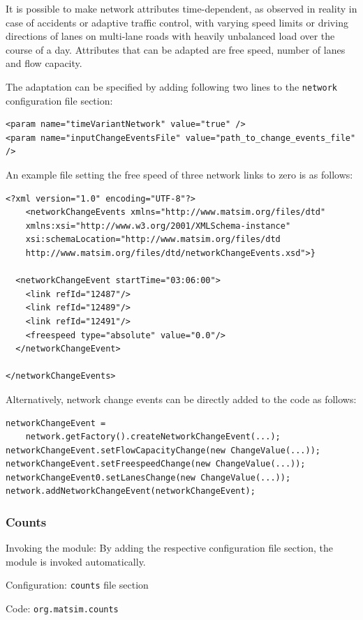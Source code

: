 It is possible to make network attributes time-dependent, as observed in reality in case of accidents or adaptive traffic control, with varying speed limits or driving directions of lanes on multi-lane roads with heavily unbalanced load over the course of a day. Attributes that can be adapted are free speed, number of lanes and flow capacity.

The adaptation can be specified by adding following two lines to the \lstinline|network| configuration file section:
\begin{lstlisting}
<param name="timeVariantNetwork" value="true" />
<param name="inputChangeEventsFile" value="path_to_change_events_file" />
\end{lstlisting}
%
An example file setting the free speed of three network links to zero is as follows:
%
\begin{lstlisting}
<?xml version="1.0" encoding="UTF-8"?>
	<networkChangeEvents xmlns="http://www.matsim.org/files/dtd"
	xmlns:xsi="http://www.w3.org/2001/XMLSchema-instance"
	xsi:schemaLocation="http://www.matsim.org/files/dtd
	http://www.matsim.org/files/dtd/networkChangeEvents.xsd">}

  <networkChangeEvent startTime="03:06:00">
    <link refId="12487"/>
    <link refId="12489"/>
    <link refId="12491"/>
    <freespeed type="absolute" value="0.0"/>
  </networkChangeEvent>

</networkChangeEvents>
\end{lstlisting}
%
Alternatively, network change events can be directly added to the code as follows:
\begin{lstlisting}
networkChangeEvent =
	network.getFactory().createNetworkChangeEvent(...);
networkChangeEvent.setFlowCapacityChange(new ChangeValue(...));
networkChangeEvent.setFreespeedChange(new ChangeValue(...));
networkChangeEvent0.setLanesChange(new ChangeValue(...));
network.addNetworkChangeEvent(networkChangeEvent);
\end{lstlisting}


\subsubsection{Counts}
\label{sec:counts}
\begin{compactitem}
\item Invoking the module: By adding the respective configuration file section, the module is invoked automatically.
\item Configuration: \lstinline|counts| file section
\item Code: \lstinline|org.matsim.counts|
\end{compactitem}

